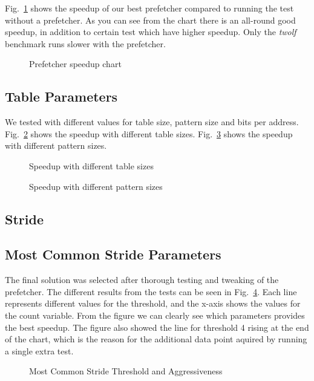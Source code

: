 Fig.~\ref{fig:prefetcher_speedup} shows the speedup of our best prefetcher
compared to running the test without a prefetcher. As you can see from the
chart there is an all-round good speedup, in addition to certain test which
have higher speedup. Only the \emph{twolf} benchmark runs slower with the
prefetcher.

\begin{figure}
	
	\caption{Prefetcher speedup chart}
	\label{fig:prefetcher_speedup}
\end{figure}

\subsection{Table Parameters}
We tested with different values for table size, pattern size and bits per address.
Fig.~\ref{fig:table_size_chart} shows the speedup with different table sizes.
Fig.~\ref{fig:pattern_size} shows the speedup with different pattern sizes.

\begin{figure}
	
	\caption{Speedup with different table sizes}
	\label{fig:table_size_chart}
\end{figure}

\begin{figure}
	
	\caption{Speedup with different pattern sizes}
	\label{fig:pattern_size}
\end{figure}

\subsection{Stride}

\subsection{Most Common Stride Parameters}

The final solution was selected after thorough testing and tweaking of the
prefetcher. The different results from the tests can be seen in
Fig.~\ref{fig:prefetcher_tweaks}. Each line represents different values for the
threshold, and the x-axis shows the values for the count variable. From the
figure we can clearly see which parameters provides the best speedup. The
figure also showed the line for threshold 4 rising at the end of the chart,
which is the reason for the additional data point aquired by running a single
extra test.

\begin{figure}
	
	\caption{Most Common Stride Threshold and Aggressiveness}
	\label{fig:prefetcher_tweaks}
\end{figure}
